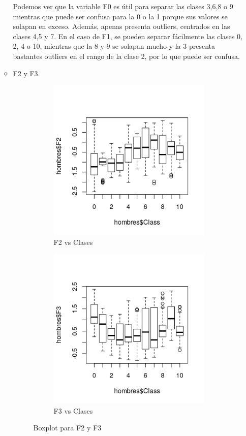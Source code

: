 \begin{itemize}
\begin{itemize}
	Podemos ver que la variable F0 es útil para separar las clases 3,6,8 o 9 mientras que puede ser confusa para la 0 o la 1 porque sus valores se solapan en exceso. Además, apenas presenta outliers, centrados en las clases 4,5 y 7. En el caso de F1, se pueden separar fácilmente las clases 0, 2, 4 o 10, mientras que la 8 y 9 se solapan mucho y la 3 presenta bastantes outliers en el rango de la clase 2, por lo que puede ser confusa. 
	\newpage
	\item F2 y F3.
	
	\begin{figure}[H]
		\centering
		\begin{subfigure}{.5\textwidth}
			\centering
			\includegraphics[width=.8\linewidth]{bphF2.png}
			\caption{F2 vs Clases}
			\label{fig:bphF2}
		\end{subfigure}%
		\begin{subfigure}{.5\textwidth}
			\centering
			\includegraphics[width=.8\linewidth]{bphF3.png}
			\caption{F3 vs Clases}
			\label{fig:bphF3}
		\end{subfigure}
		\caption{Boxplot para F2 y F3}
		\label{fig:bph23}
	\end{figure}


\end{itemize}
\end{itemize}
